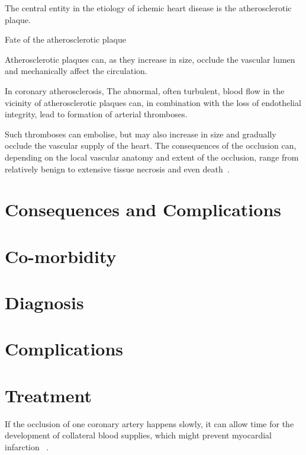 The central entity in the etiology of ichemic heart disease 
is the atherosclerotic plaque. 

Fate of the atherosclerotic plaque



Atherosclerotic plaques can, 
as they increase in size, occlude the vascular lumen 
and mechanically affect the circulation.


In coronary atherosclerosis, 
The abnormal, often turbulent, blood flow in the vicinity of atherosclerotic
plaques can, in combination with the loss of endothelial integrity, lead to
formation of arterial thromboses.
~\autocite{kumarRobbins2017}

Such thromboses can embolise, but may also increase in size and gradually 
occlude the vascular supply of the heart.
The consequences of the occlusion can,
depending on the local vascular anatomy and extent of the occlusion,
range from relatively benign to extensive tissue necrosis
and even death~\autocite{kumarRobbins2017}.

\section{Consequences and Complications}
\section{Co-morbidity}
\section{Diagnosis}
\section{Complications}
\section{Treatment}

If the occlusion of one coronary artery happens slowly, 
it can allow time for the development of collateral blood supplies,
which might prevent myocardial infarction
~\autocite{kumarRobbins2017}.
